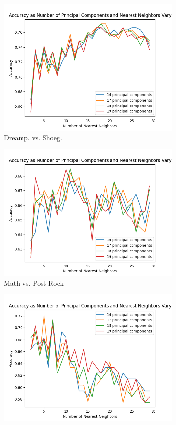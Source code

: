 \documentclass[letterpaper, 12 pt, conference]{ieeeconf}  %
\begin{document}
\begin{figure}[!hb] 
  \begin{subfigure}{.23\textwidth}
    \centering
    \includegraphics[width=.8\linewidth]{knnplot_dpsg.png}
    \caption{Dreamp. vs. Shoeg.}
    \label{fig:knngraph1}
  \end{subfigure}
  \begin{subfigure}{.23\textwidth}
    \centering
    \includegraphics[width=.8\linewidth]{knnplot_mrpr.png}
    \caption{Math vs. Post Rock}
    \label{fig:knngraph2}
  \end{subfigure}
\newline
  \begin{subfigure}{.23\textwidth}
    \centering
    \includegraphics[width=.8\linewidth]{knnplot_frrr.png}

\end{subfigure}
\end{figure}
\end{document}

